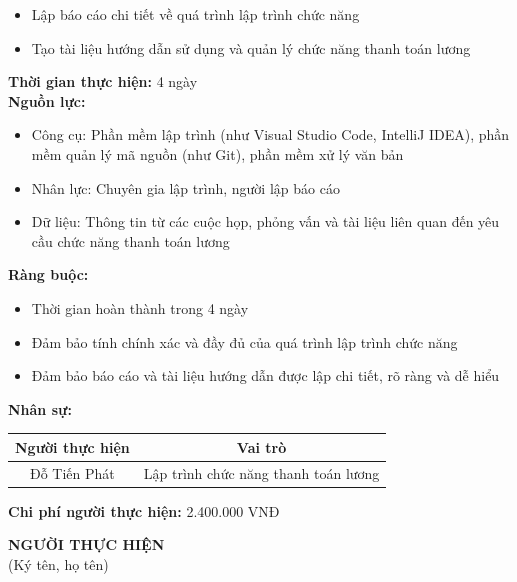 {\begin{minipage}{\textwidth}
\begin{itemize}
        \item Lập báo cáo chi tiết về quá trình lập trình chức năng
        \item Tạo tài liệu hướng dẫn sử dụng và quản lý chức năng thanh toán lương
    \end{itemize}
    \vspace{0.5cm}
    \noindent \textbf{Thời gian thực hiện:} 4 ngày \\
    \noindent \textbf{Nguồn lực:}
    \begin{itemize}
        \item Công cụ: Phần mềm lập trình (như Visual Studio Code, IntelliJ IDEA), phần mềm quản lý mã nguồn (như Git), phần mềm xử lý văn bản
        \item Nhân lực: Chuyên gia lập trình, người lập báo cáo
        \item Dữ liệu: Thông tin từ các cuộc họp, phỏng vấn và tài liệu liên quan đến yêu cầu chức năng thanh toán lương
    \end{itemize}
    \vspace{0.5cm}
    \noindent \textbf{Ràng buộc:}
    \begin{itemize}
        \item Thời gian hoàn thành trong 4 ngày
        \item Đảm bảo tính chính xác và đầy đủ của quá trình lập trình chức năng
        \item Đảm bảo báo cáo và tài liệu hướng dẫn được lập chi tiết, rõ ràng và dễ hiểu
    \end{itemize}
    \vspace{0.5cm}
    \noindent \textbf{Nhân sự:}
    \begin{longtable}{|c|c|}
    \hline
    \textbf{Người thực hiện} & \textbf{Vai trò} \\
    \hline
    Đỗ Tiến Phát & Lập trình chức năng thanh toán lương \\
    \hline
    \end{longtable}
    \vspace{0.5cm}
    \noindent \textbf{Chi phí người thực hiện:} 2.400.000 VNĐ \\
    \vspace{1cm}
    \begin{flushleft}
        \hspace{8cm} \textbf{NGƯỜI THỰC HIỆN} \\
        \hspace{8.8cm} (Ký tên, họ tên) \\
        \vspace{1cm}
    \end{flushleft}
    \end{minipage}
}
% 
